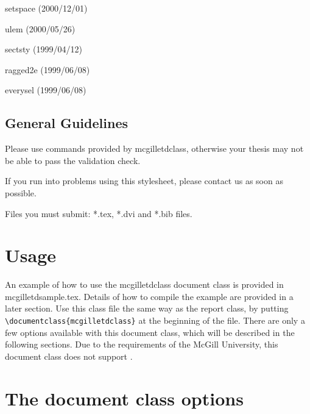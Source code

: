 \documentclass[12pt,Bold,letterpaper,TexShade]{mcgilletdclass}
\numberwithin{equation}{section}
\begin{document}
\begin{BulletList}
	\item{setspace (2000/12/01)}
	\item{ulem (2000/05/26)}
	\item{sectsty (1999/04/12)}
	\item{ragged2e (1999/06/08)}
	\item{everysel (1999/06/08)}
\end{BulletList}
\section{General Guidelines}
\label{sec:NumericalResults}
\begin{BulletList}
	\item{Please use commands provided by mcgilletdclass, otherwise your thesis may not be able to pass the validation check.}
	\item{If you run into problems using this stylesheet, please contact us as soon as possible.}
	\item{Files you must submit: *.tex, *.dvi and *.bib files.}
\end{BulletList}


\chapter{Usage}
An example of how to use the mcgilletdclass document class is provided in 
mcgilletdsample.tex. Details of how to compile the example are 
provided in a later section.
Use this class file the same way as the report class, by putting
\verb=\documentclass{mcgilletdclass}= at the beginning of the \LaTeXe file.
There are only a few options available with this document class, which
will be described in the following sections. Due to the requirements of
the McGill University, this document class does not support .

\chapter{The document class options}
\end{document}
